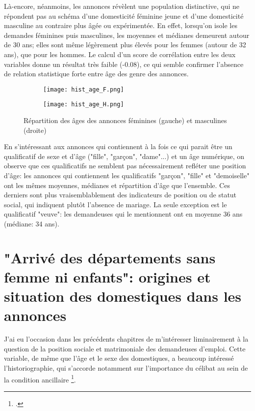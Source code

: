 Là-encore, néanmoins, les annonces révèlent une population distinctive, qui ne répondent pas au schéma d'une domesticité féminine jeune et d'une domesticité masculine au contraire plus âgée ou expérimentée. En effet, lorsqu'on isole les demandes féminines puis masculines, les moyennes et médianes demeurent autour de 30 ans; elles sont même légèrement plus élevés pour les femmes (autour de 32 ans), que pour les hommes. Le calcul d'un score de corrélation entre les deux variables donne un résultat très faible (-0.08), ce qui semble confirmer l'absence de relation statistique forte entre âge des genre des annonces. 

\begin{figure}[ht]
	\centering
	\begin{subfigure}[b]{0.4\textwidth}
		\centering
		\texttt{[image: hist\_age\_F.png]}
	\end{subfigure}
	\begin{subfigure}[b]{0.4\textwidth}
		\centering
		\texttt{[image: hist\_age\_H.png]}
	\end{subfigure}
	\caption{Répartition des âges des annonces féminines (gauche) et masculines (droite)}
\end{figure}



En s'intéressant aux annonces qui contiennent à la fois ce qui parait être un qualificatif de sexe et d'âge ("fille", "garçon", "dame"...) et un âge numérique, on observe que ces qualificatifs ne semblent pas nécessairement refléter une position d'âge: les annonces qui contiennent les qualificatifs "garçon", "fille" et "demoiselle" ont les mêmes moyennes, médianes et répartition d'âge que l'ensemble. Ces derniers sont plus vraisemblablement des indicateurs de position ou de statut social, qui indiquent plutôt l'absence de mariage. La seule exception est le qualificatif "veuve": les demandeuses qui le mentionnent ont en moyenne 36 ans (médiane: 34 ans).



\chapter{"Arrivé des départements sans femme ni enfants": origines et situation des domestiques dans les annonces}

J'ai eu l'occasion dans les précédents chapitres de m'intéresser liminairement à la question de la position sociale et matrimoniale des demandeuses d'emploi. Cette variable, de même que l'âge et le sexe des domestiques, a beaucoup intéressé l'historiographie, qui s'accorde notamment sur l'importance du célibat au sein de la condition ancillaire \footcites{chamouxDomesticiteParcoursVie2009}. 

